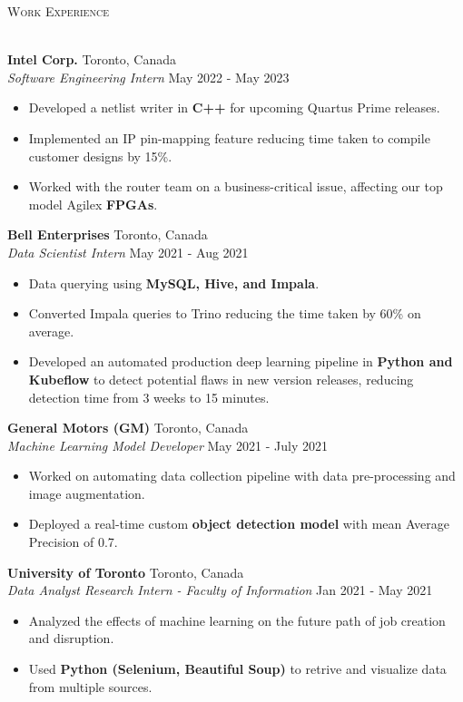 \documentclass[a4paper]{article}
\newcommand{\lineunder} {
    \vspace*{-8pt} \\
    \hspace*{-18pt} \hrulefill \\
}
\newcommand{\header} [1] {
    {\hspace*{-18pt}\vspace*{6pt} \textsc{#1}}
    \vspace*{-6pt} \lineunder
}
\begin{document}
\header{Work Experience}
\vspace{1mm}

\textbf{Intel Corp.} \hfill Toronto, Canada\\
\textit{Software Engineering Intern} \hfill May 2022 - May 2023\\
\vspace{-3mm}
\begin{itemize} \itemsep 1pt
	\item Developed a netlist writer in \textbf{C++} for upcoming Quartus Prime releases.
	\item Implemented an IP pin-mapping feature reducing time taken to compile customer designs by 15\%.
	\item Worked with the router team on a business-critical issue, affecting our top model Agilex \textbf{FPGAs}. 
\end{itemize}

\textbf{Bell Enterprises} \hfill Toronto, Canada\\
\textit{Data Scientist Intern} \hfill May 2021 - Aug 2021\\
\vspace{-3mm}
\begin{itemize} \itemsep 1pt
	\item Data querying using \textbf{MySQL, Hive, and Impala}. 
	\item Converted Impala queries to Trino reducing the time taken by 60\% on average.
	\item Developed an automated production deep learning pipeline in \textbf{Python and Kubeflow} to detect potential flaws in new version releases, reducing detection time from 3 weeks to 15 minutes.
\end{itemize}

\textbf{General Motors (GM)} \hfill Toronto, Canada\\
\textit{Machine Learning Model Developer} \hfill May 2021 - July 2021\\
\vspace{-3mm}
\begin{itemize} \itemsep 1pt
	\item Worked on automating data collection pipeline with data pre-processing and image augmentation.
	\item Deployed a real-time custom \textbf{object detection model} with mean Average Precision of 0.7.
\end{itemize}

\textbf{University of Toronto} \hfill Toronto, Canada\\
\textit{Data Analyst Research Intern - Faculty of Information} \hfill Jan 2021 - May 2021\\
\vspace{-3mm}
\begin{itemize} \itemsep 1pt
    \item Analyzed the effects of machine learning on the future path of job creation and disruption.
	\item Used \textbf{Python (Selenium, Beautiful Soup)} to retrive and visualize data from multiple sources.
\end{itemize}
\end{document}
